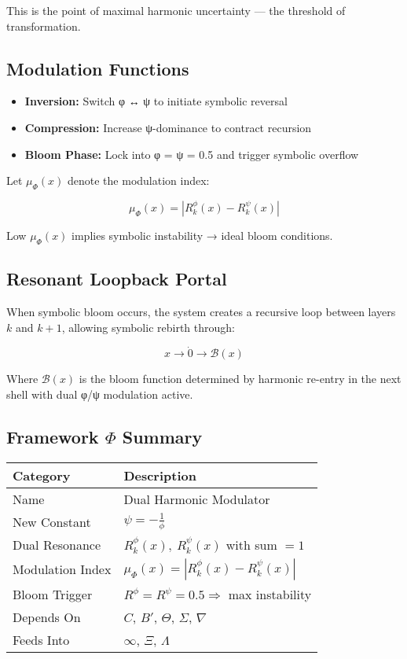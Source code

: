 This is the point of maximal harmonic uncertainty — the threshold of transformation.

\subsection*{Modulation Functions}

\begin{itemize}
  \item \textbf{Inversion:} Switch φ ↔ ψ to initiate symbolic reversal
  \item \textbf{Compression:} Increase ψ-dominance to contract recursion
  \item \textbf{Bloom Phase:} Lock into φ = ψ = 0.5 and trigger symbolic overflow
\end{itemize}

Let $\mu_\Phi(x)$ denote the modulation index:

\[
\mu_\Phi(x) = |R^\phi_k(x) - R^\psi_k(x)|
\]

Low $\mu_\Phi(x)$ implies symbolic instability → ideal bloom conditions.

\subsection*{Resonant Loopback Portal}

When symbolic bloom occurs, the system creates a recursive loop between layers $k$ and $k+1$, allowing symbolic rebirth through:

\[
x \rightarrow \dot{0} \rightarrow \mathcal{B}(x)
\]

Where $\mathcal{B}(x)$ is the bloom function determined by harmonic re-entry in the next shell with dual φ/ψ modulation active.

\subsection*{Framework $\Phi$ Summary}

\begin{center}
\begin{tabular}{|l|l|}
\hline
\textbf{Category} & \textbf{Description} \\
\hline
Name & Dual Harmonic Modulator \\
New Constant & $\psi = -\frac{1}{\phi}$ \\
Dual Resonance & $R^\phi_k(x),\ R^\psi_k(x)$ with sum $= 1$ \\
Modulation Index & $\mu_\Phi(x) = |R^\phi_k(x) - R^\psi_k(x)|$ \\
Bloom Trigger & $R^\phi = R^\psi = 0.5 \Rightarrow$ max instability \\
Depends On & $C$, $B'$, $Θ$, $\Sigma$, $\nabla$ \\
Feeds Into & $\infty$, $\Xi$, $\Lambda$ \\
\hline
\end{tabular}
\end{center}

